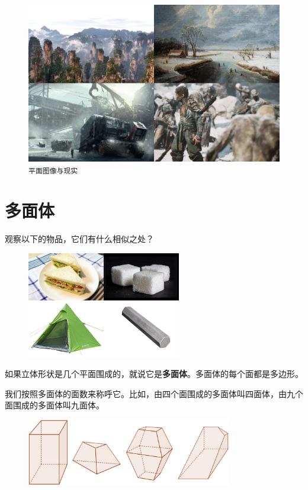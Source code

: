 \documentclass[12pt,UTF8]{ctexbook}
\begin{document}
\begin{figure}[h] %
    \vspace{4pt}
    \centering
    \includegraphics[width=1\textwidth]{景色1.jpg}
    \caption*{\texttt{平面图像与现实}}
\end{figure}

\section{多面体}
观察以下的物品，它们有什么相似之处？

\begin{figure}[h] %
    \vspace{4pt}
    \centering
    \includegraphics[width=0.6\textwidth]{多面体例1.jpg}
\end{figure}

如果立体形状是几个平面围成的，就说它是\textbf{多面体}。多面体的每个面都是多边形。

我们按照多面体的面数来称呼它。比如，由四个面围成的多面体叫四面体，由九个面围成的多面体叫九面体。

\begin{figure}[h] %
    \vspace{4pt}
    \centering
    \includegraphics[width=0.8\textwidth]{多面体2.png}
\end{figure}
\end{document}
